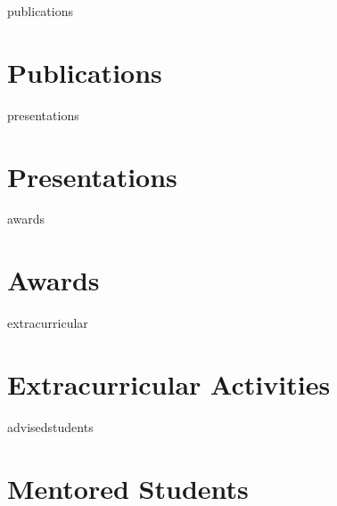 \documentclass[12pt]{report} %
\begin{document}

\ifcsname publications\endcsname%
\section{Publications}
\publications{}
\fi



\ifcsname presentations\endcsname%
\section{Presentations}
\presentations{}
\fi



\ifcsname awards\endcsname%
\section{Awards}
\awards{}
\fi



\ifcsname extracurricular\endcsname%
\section{Extracurricular Activities}
\extracurricular{}
\fi



\ifcsname advisedstudents\endcsname%
\section{Mentored Students}
\advisedstudents{}
\fi


\end{document}
